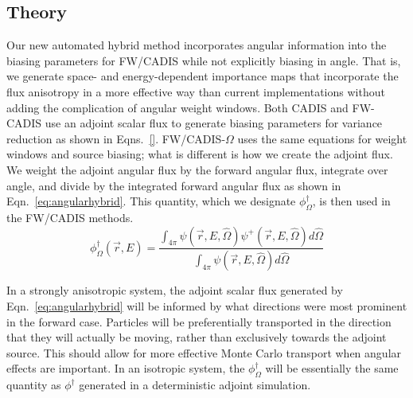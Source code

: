 \documentclass[12pt]{article}
\begin{document}
%
\subsection{Theory}
\label{subsect::theory}

Our new automated hybrid method incorporates angular information into the biasing parameters for FW/CADIS while not explicitly biasing in angle. 
That is, we generate space- and energy-dependent importance maps that incorporate the flux anisotropy in a more effective way than current implementations without adding the complication of angular weight windows. 
Both CADIS and FW-CADIS use an adjoint scalar flux to generate biasing parameters for variance reduction as shown in Eqns.~\eqref{}. 
FW/CADIS-$\Omega$ uses the same equations for weight windows and source biasing; what is different is how we create the adjoint flux. 
We weight the adjoint angular flux by the forward angular flux, integrate over angle, and divide by the integrated forward angular flux as shown in Eqn.~\eqref{eq:angularhybrid}.
This quantity, which we designate $\phi^{\dagger}_{\Omega}$, is then used in the FW/CADIS methods.
%
\begin{equation} 
\phi^{\dagger}_{\Omega}(\vec{r},E) = \frac{\int_{4\pi} \psi(\vec {r} ,E,\hat{\Omega})\psi^+(\vec {r} ,E,\hat{\Omega})d\hat\Omega }{\int_{4\pi}\psi(\vec {r} ,E,\hat{\Omega})d\hat\Omega}
\label{eq:angularhybrid}
\end{equation}

In a strongly anisotropic system, the adjoint scalar flux generated by Eqn.~\eqref{eq:angularhybrid} will be informed by what directions were most prominent in the forward case. 
Particles will be preferentially transported in the direction that they will actually be moving, rather than exclusively towards the adjoint source. 
This should allow for more effective Monte Carlo transport when angular effects are important. 
In an isotropic system, the $\phi^{\dagger}_{\Omega}$ will be essentially the same quantity as $\phi^{\dagger}$ generated in a deterministic adjoint simulation. 
\end{document}
